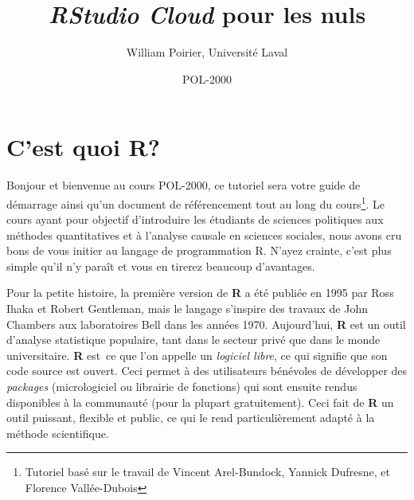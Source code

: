 \documentclass[10.5pt,a4paper]{article}
\title{\textbf{\emph{RStudio Cloud}} pour les nuls}
\author{William Poirier, Université Laval}
\date{POL-2000}
\begin{document}
 

\restoregeometry %
\nopagecolor%

\tableofcontents

\pagebreak

\section{C'est quoi R?}
Bonjour et bienvenue au cours POL-2000, ce tutoriel sera votre guide de démarrage ainsi qu'un document de référencement tout au long du cours\footnote{Tutoriel basé sur le travail de Vincent Arel-Bundock, Yannick Dufresne, et Florence Vallée-Dubois}. Le cours ayant pour objectif d'introduire les étudiants de sciences politiques aux méthodes quantitatives et à l'analyse causale en sciences sociales, nous avons cru bons de vous initier au langage de programmation R. N'ayez crainte, c'est plus simple qu'il n'y paraît et vous en tirerez beaucoup d'avantages. 

Pour la petite histoire, la première version de \textbf{R} a été publiée en 1995 par Ross Ihaka et Robert Gentleman, mais le langage s'inspire des travaux de John Chambers aux laboratoires Bell dans les années 1970. Aujourd'hui, \textbf{R} est un outil d'analyse statistique populaire, tant dans le secteur privé que dans le monde universitaire. \textbf{R} est\ ce que l'on appelle un \textit{logiciel libre}, ce qui signifie que son code source est ouvert. Ceci permet à des utilisateurs bénévoles de développer des \textit{packages} (micrologiciel ou librairie de fonctions) qui sont ensuite rendus disponibles à la communauté (pour la plupart gratuitement). Ceci fait de \textbf{R} un outil puissant, flexible et public, ce qui le rend particulièrement adapté à la méthode scientifique. 
\end{document}
